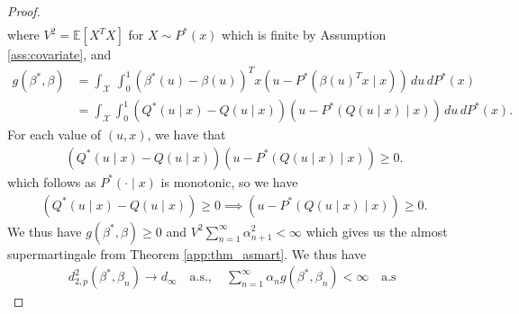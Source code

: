 \documentclass[11pt,a4paper]{article}
\newcommand{\E}{\mathbb{E}}
\begin{document}
\begin{appendices}
\begin{proof}
\begin{align*}
\end{align*}
where $V^2 = \E[X^T X]$ for $X \sim P^*(x)$ which is finite by {{Assumption \ref{ass:covariate}}}, and 
\begin{align*}
    g(\beta^*,\beta) &=\int_{\mathcal{X}} \, \int_0^1  \left(\beta^*(u) - \beta(u)\right)^T x\left(u - P^*\left(\beta(u)^T x \mid x\right)\right) \, du\, dP^*(x)\\
    &= \int_{\mathcal{X}}\int_0^1 \left(Q^*(u \mid x) -Q(u \mid x)\right)\left(u - P^*\left(Q(u \mid x)\mid x\right)\right)\,du \, dP^*(x).
\end{align*}
For each value of $(u,x)$, we have that 
\begin{align*}
    \left(Q^*(u \mid x) -Q(u \mid x)\right)\left(u - P^*\left(Q(u \mid x) \mid x\right)\right) \geq 0.
\end{align*}
which follows as $P^*(\cdot  \mid x)$ is monotonic, so we have
\begin{align*}
     \left(Q^*(u \mid x) -Q(u \mid x)\right)\geq 0 \implies \left(u - P^*\left(Q(u \mid x) \mid x\right)\right) \geq 0.
\end{align*}
We thus have $g(\beta^*, \beta) \geq 0$  and $V^2\sum_{n =1}^\infty{\alpha_{n+1}^2} < \infty$ which gives us the almost supermartingale from {Theorem \ref{app:thm_asmart}}. We thus have
\begin{align*}
    d^2_{2,p}\left(\beta^*, \beta_n\right) \to d_\infty \quad \text{a.s.}, \quad 
    \sum_{n = 1}^\infty \alpha_n g\left(\beta^*,\beta_n\right) < \infty \quad \text{a.s }
\end{align*}


\end{proof}
\end{appendices}
\end{document}
